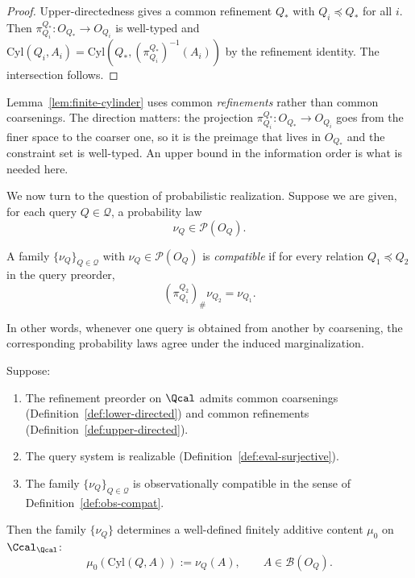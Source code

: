 \begin{proof}
Upper-directedness gives a common refinement $Q_*$ with $Q_i\preceq Q_*$
for all $i$.  Then $\pi^{Q_*}_{Q_i}:O_{Q_*}\to O_{Q_i}$ is well-typed
and $\mathrm{Cyl}(Q_i,A_i)=\mathrm{Cyl}(Q_*,(\pi^{Q_*}_{Q_i})^{-1}(A_i))$
by the refinement identity.  The intersection follows.
\end{proof}

\begin{remark}
Lemma~\ref{lem:finite-cylinder} uses common \emph{refinements} rather
than common coarsenings.  The direction matters: the projection
$\pi^{Q_*}_{Q_i}:O_{Q_*}\to O_{Q_i}$ goes from the finer space to the
coarser one, so it is the preimage that lives in $O_{Q_*}$ and the
constraint set is well-typed.  An upper bound in the information order
is what is needed here.
\end{remark}

We now turn to the question of probabilistic realization.
Suppose we are given, for each query $Q \in \mathcal Q$, a probability law
\[
\nu_Q \in \mathcal P(O_Q).
\]

\begin{definition}
\label{def:obs-compat}
A family $\{\nu_Q\}_{Q \in \mathcal Q}$ with $\nu_Q \in \mathcal P(O_Q)$
is \emph{compatible} if for every relation $Q_1 \preceq Q_2$ in the query preorder,
\[
(\pi^{Q_2}_{Q_1})_\# \nu_{Q_2}=\nu_{Q_1}.
\]
\end{definition}

In other words, whenever one query is obtained from another by
coarsening, the corresponding probability laws agree under the induced
marginalization.

\begin{theorem}
\label{thm:finite-content}
Suppose:
\begin{enumerate}
\item The refinement preorder on $\Qcal$ admits common coarsenings
(Definition~\ref{def:lower-directed}) and common refinements
(Definition~\ref{def:upper-directed}).
\item The query system is realizable (Definition~\ref{def:eval-surjective}).
\item The family $\{\nu_Q\}_{Q \in \mathcal Q}$ is observationally compatible
in the sense of Definition~\ref{def:obs-compat}.
\end{enumerate}
Then the family $\{\nu_Q\}$ determines a well-defined finitely
additive content $\mu_0$ on $\Ccal_{\Qcal}$:
\[
\mu_0(\mathrm{Cyl}(Q,A)) := \nu_Q(A), \qquad A\in\mathcal B(O_Q).
\]
\end{theorem}


